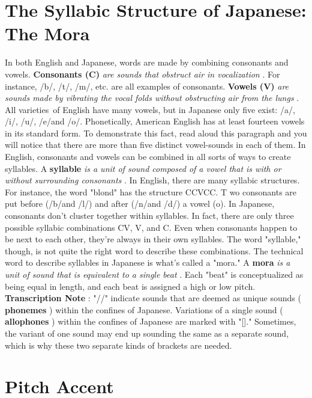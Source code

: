 \section{The Syllabic Structure of Japanese: The Mora}
  \hfill\break
 In both English and Japanese, words are made by combining consonants and vowels. \textbf{Consonants (C) }\emph{are sounds that obstruct air in vocalization }. For instance, \slash b\slash , \slash t\slash , \slash m\slash , etc. are all examples of consonants. \textbf{Vowels (V) } \emph{are sounds made by vibrating the vocal folds without obstructing air from the lungs }. All varieties of English have many vowels, but in Japanese only five exist: \slash a\slash , \slash i\slash , \slash u\slash , \slash e\slash  and \slash o\slash . \hfill\break
\hfill\break
 Phonetically, American English has at least fourteen vowels in its standard form. To demonstrate this fact, read aloud this paragraph and you will notice that there are more than five distinct vowel-sounds in each of them.   In English, consonants and vowels can be combined in all sorts of ways to create syllables. A \textbf{syllable } \emph{is a unit of sound composed of a vowel that is with or without surrounding consonants }. In English, there are many syllabic structures. For instance, the word "blond" has the structure CCVCC. T wo consonants are put before (\slash b\slash  and \slash l\slash ) and after (\slash n\slash  and \slash d\slash ) a vowel (o). \hfill\break
 \hfill\break
 In Japanese, consonants don't cluster together within syllables. In fact, there are only three possible syllabic combinations CV, V, and C. Even when consonants happen to be next to each other, they're always in their own syllables. The word "syllable," though, is not quite the right word to describe these combinations. The technical word to describe syllables in Japanese is what's called a "mora." A \textbf{mora } \emph{is a unit of sound that is equivalent to a single beat }. Each "beat" is conceptualized as being equal in length, and each beat is assigned a high or low pitch. \hfill\break
\textbf{Transcription Note }: "\slash \slash " indicate sounds that are deemed as unique sounds ( \textbf{phonemes }) within the confines of Japanese. Variations of a single sound ( \textbf{allophones }) within the confines of Japanese are marked with "[]." Sometimes, the variant of one sound may end up sounding the same as a separate sound, which is why these two separate kinds of brackets are needed.       
\section{Pitch Accent}
 
